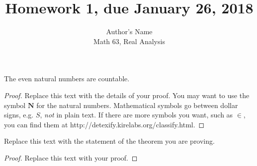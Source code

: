 \documentclass{article}
\newenvironment{theorem}[2][Theorem]{\begin{trivlist}
\item[\hskip \labelsep {\bfseries #1}\hskip \labelsep {\bfseries #2.}]}{\end{trivlist}}
\begin{document}

\title{Homework 1, due January 26, 2018} %
\author{Author's Name\\Math 63, Real Analysis} %

\maketitle

%

\begin{theorem}{(Page P1 $\#$ 2)}
The even natural numbers are countable.
\end{theorem}

\begin{proof}
Replace this text with the details of your proof. You may want to use the symbol $\mathbf{N}$ for the natural numbers. Mathematical symbols go between dollar signs, e.g. $S$, \emph{not} in plain text. If there are more symbols you want, such as $\in$, you can find them at http://detexify.kirelabs.org/classify.html.
\end{proof}


\vspace{0.25in} %

\begin{theorem}{(Page P1 $\#$ 7)}
Replace this text with the statement of the theorem you are proving.
\end{theorem}

\begin{proof}
Replace this text with your proof.
\end{proof}

\end{document}
